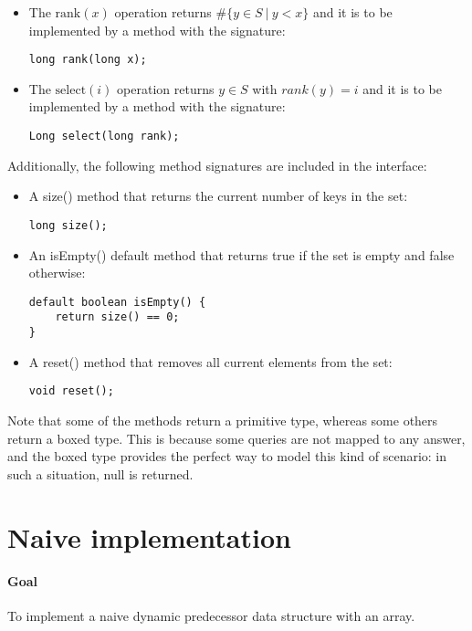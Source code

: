\begin{itemize}
    \item
    The $\text{rank}(x)$ operation returns $\#\{ y \in S\ |\ y < x\}$ and it is to be implemented by a method with the signature:
    \begin{lstlisting}
long rank(long x);
    \end{lstlisting}

    \item
    The $\text{select}(i)$ operation returns $y \in S$ with $rank(y) = i$ and it is to be implemented by a method with the signature:
    \begin{lstlisting}
Long select(long rank);
    \end{lstlisting}
\end{itemize}
Additionally, the following method signatures are included in the interface:
\begin{itemize}
    \item
    A {\ttfamily size()} method that returns the current number of keys in the set:
    \begin{lstlisting}
long size();
    \end{lstlisting}

    \item
    An {\ttfamily isEmpty()} default method that returns {\ttfamily true} if the set is empty and {\ttfamily false} otherwise:
    \begin{lstlisting}
default boolean isEmpty() {
    return size() == 0;
}
    \end{lstlisting}

    \item
    A {\ttfamily reset()} method that removes all current elements from the set:
    \begin{lstlisting}
void reset();
    \end{lstlisting}
\end{itemize}

Note that some of the methods return a primitive type, whereas some others return a boxed type. This is because some queries are not mapped to any answer, and the boxed type provides the perfect way to model this kind of scenario: in such a situation, {\ttfamily null} is returned.

\newpage
\section{Naive implementation} \label{sec:naiveImplementation}

\paragraph*{Goal}
To implement a naive dynamic predecessor data structure with an array.

